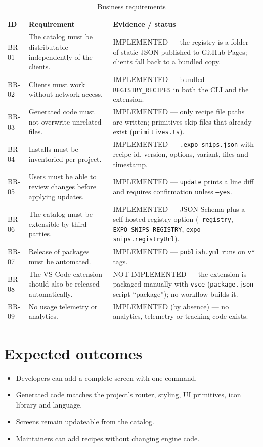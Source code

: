 \begin{longtable}{p{1.6cm}p{5.4cm}p{7.4cm}}
\caption{Business requirements}\\
\toprule
\textbf{ID} & \textbf{Requirement} & \textbf{Evidence / status} \\
\midrule

BR-01 & The catalog must be distributable independently of the clients. & IMPLEMENTED --- the registry is a folder of static JSON published to GitHub Pages; clients fall back to a bundled copy. \\
BR-02 & Clients must work without network access. & IMPLEMENTED --- bundled \texttt{REGISTRY\_RECIPES} in both the CLI and the extension. \\
BR-03 & Generated code must not overwrite unrelated files. & IMPLEMENTED --- only recipe file paths are written; primitives skip files that already exist (\texttt{primitives.ts}). \\
BR-04 & Installs must be inventoried per project. & IMPLEMENTED --- \texttt{.expo-snips.json} with recipe id, version, options, variant, files and timestamp. \\
BR-05 & Users must be able to review changes before applying updates. & IMPLEMENTED --- \texttt{update} prints a line diff and requires confirmation unless \texttt{--yes}. \\
BR-06 & The catalog must be extensible by third parties. & IMPLEMENTED --- JSON Schema plus a self-hosted registry option (\texttt{--registry}, \texttt{EXPO\_SNIPS\_REGISTRY}, \texttt{expo-snips.registryUrl}). \\
BR-07 & Release of packages must be automated. & IMPLEMENTED --- \texttt{publish.yml} runs on \texttt{v*} tags. \\
BR-08 & The VS Code extension should also be released automatically. & NOT IMPLEMENTED --- the extension is packaged manually with \texttt{vsce} (\texttt{package.json} script ``package''); no workflow builds it. \\
BR-09 & No usage telemetry or analytics. & IMPLEMENTED (by absence) --- no analytics, telemetry or tracking code exists. \\
\bottomrule
\end{longtable}

\section{Expected outcomes}

\begin{itemize}
  \item Developers can add a complete screen with one command.
  \item Generated code matches the project's router, styling, UI primitives, icon
        library and language.
  \item Screens remain updateable from the catalog.
  \item Maintainers can add recipes without changing engine code.
\end{itemize}

